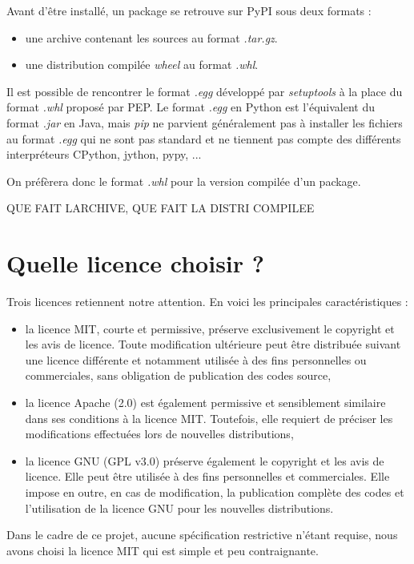 \documentclass[twoside,a4paper,11pt,frenchb,openany]{report}
\begin{document}
Avant d'être installé, un package se retrouve sur PyPI sous deux formats :
\begin{itemize}
\item une archive contenant les sources au format \textit{.tar.gz}.
\item une distribution compilée \textit{wheel} au format \textit{.whl}. 
\end{itemize}

Il est possible de rencontrer le format \textit{.egg} développé par \textit{setuptools} à la place du format \textit{.whl} proposé par PEP. Le format \textit{.egg} en Python est l'équivalent du format \textit{.jar} en Java, mais \textit{pip} ne parvient généralement pas à installer les fichiers au format \textit{.egg} qui ne sont pas standard et ne tiennent pas compte des différents interpréteurs CPython, jython, pypy, ...

On préfèrera donc le format \textit{.whl} pour la version compilée d'un package.

QUE FAIT LARCHIVE, QUE FAIT LA DISTRI COMPILEE


\section{Quelle licence choisir ?}
	
Trois licences retiennent notre attention. En voici les principales caractéristiques :
\begin{itemize}
\item	la licence MIT, courte et permissive, préserve exclusivement le copyright et les avis de licence. Toute modification ultérieure peut être distribuée suivant une licence différente et notamment utilisée à des fins personnelles ou commerciales, sans obligation de publication des codes source,
\item	la licence Apache (2.0) est également permissive et sensiblement similaire dans ses conditions à la licence MIT. Toutefois, elle requiert de préciser les modifications effectuées lors de nouvelles distributions,
\item	la licence GNU (GPL v3.0) préserve également le copyright et les avis de licence. Elle peut être utilisée à des fins personnelles et commerciales. Elle impose en outre, en cas de modification, la publication complète des codes et l'utilisation de la licence GNU pour les nouvelles distributions.
\end{itemize}

Dans le cadre de ce projet, aucune spécification restrictive n'étant requise, nous avons choisi la licence MIT qui est simple et peu contraignante.
\end{document}
